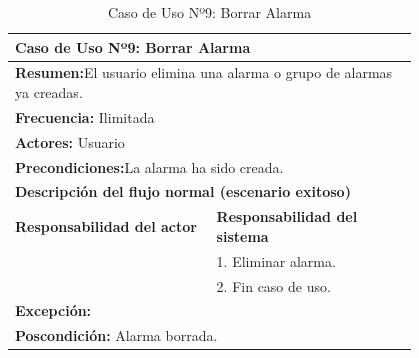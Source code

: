 \begin{table}[H]
    \centering
    \caption{Caso de Uso Nº9: Borrar Alarma}
    
    \begin{tabular}{| p{0.4\linewidth} | p{0.4\linewidth} |}
        \hline
        \multicolumn{2}{|l|}{\textbf{Caso de Uso Nº9:} Borrar Alarma} \\
        \hline
        \multicolumn{2}{|l|}{\textbf{Resumen:}El usuario elimina una alarma o grupo de alarmas ya creadas.} \\
        \hline
        \multicolumn{2}{|l|}{\textbf{Frecuencia:}  Ilimitada} \\
        \hline
        \multicolumn{2}{|l|}{\textbf{Actores:}  Usuario} \\
        \hline
        \multicolumn{2}{|l|}{\textbf{Precondiciones:}La alarma ha sido creada.} \\
        \hline
        \multicolumn{2}{|l|}{\textbf{Descripción del flujo normal (escenario exitoso)} } \\
        \hline
        \textbf{Responsabilidad del actor} & \textbf{Responsabilidad del sistema}\\
            & 1. Eliminar alarma.\\
            & 2. Fin caso de uso. \\
        \hline
        \multicolumn{2}{|p{0.8\linewidth}|}{
                \textbf{Excepción:}} \\
        \hline
        \multicolumn{2}{|l|}{\textbf{Poscondición:}  Alarma borrada.} \\
        \hline
    \end{tabular}

    \label{table:9}
\end{table}

